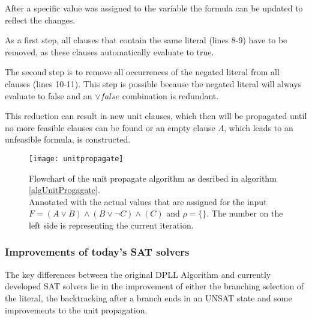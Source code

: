 After a specific value was assigned to the variable the formula can be updated to reflect the changes. 

As a first step, all clauses that contain the same literal (lines 8-9) have to be removed, as these clauses automatically evaluate to true. 

The second step is to remove all occurrences of the negated literal from all clauses (lines 10-11). This step is possible because the negated literal will always evaluate to false and an $\lor false$ combination is redundant.

This reduction can result in new unit clauses, which then will be propagated until no more feasible clauses can be found or an empty clause $\Lambda$, which leads to an unfeasible formula, is constructed.

\begin{figure}[H]
\texttt{[image: unitpropagate]}
\centering
\caption{Flowchart of the unit propagate algorithm as desribed in algorithm \ref{algUnitProgagate}.\\ Annotated with the actual values that are assigned for the input $F=(A \lor B ) \land (B \lor \lnot C) \land (C)$ and $\rho = \{\}$. The number on the left side is representing the current iteration.}
\label{fig:unitpropagate}
\end{figure}


\subsubsection{Improvements of today's SAT solvers}
The key differences between the original DPLL Algorithm and currently developed SAT solvers lie in the improvement of either the branching selection of the literal, the backtracking after a branch ends in an UNSAT state and some improvements to the unit propagation.
